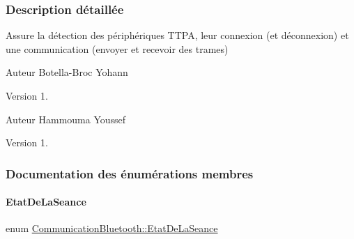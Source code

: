 \subsubsection{Description détaillée}
Assure la détection des périphériques T\+T\+PA, leur connexion (et déconnexion) et une communication (envoyer et recevoir des trames)

\begin{DoxyAuthor}{Auteur}
Botella-\/\+Broc Yohann
\end{DoxyAuthor}
\begin{DoxyVersion}{Version}
1.
\end{DoxyVersion}
\begin{DoxyAuthor}{Auteur}
Hammouma Youssef
\end{DoxyAuthor}
\begin{DoxyVersion}{Version}
1. 
\end{DoxyVersion}


\subsubsection{Documentation des énumérations membres}
\mbox{\label{class_communication_bluetooth_a414353c68cf4b316937d7c929f20d22a}} 
\paragraph{\texorpdfstring{Etat\+De\+La\+Seance}{EtatDeLaSeance}}
{\footnotesize\ttfamily enum \hyperlink{class_communication_bluetooth_a414353c68cf4b316937d7c929f20d22a}{Communication\+Bluetooth\+::\+Etat\+De\+La\+Seance}}

